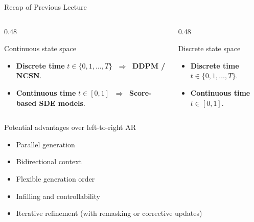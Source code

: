 \documentclass{beamer}
\begin{document}
\begin{frame}{Recap of Previous Lecture}
	\begin{columns}[T]
	\begin{column}{0.48\textwidth}
	\begin{block}{Continuous state space}
		\begin{itemize}
			\item \textbf{Discrete time} $t \in \{0,1,\ldots,T\}$ $\;\Rightarrow\;$ \textbf{DDPM / NCSN}.
			\item \textbf{Continuous time} $t \in [0,1]$ $\;\Rightarrow\;$ \textbf{Score-based SDE models}.
		\end{itemize}
	\end{block}
	\end{column}
	\begin{column}{0.48\textwidth}
	\begin{block}{Discrete state space}
		\begin{itemize}
			\item \textbf{Discrete time} $t \in \{0,1,\ldots,T\}$.
			\item \textbf{Continuous time} $t \in [0,1]$.
		\end{itemize}
	\end{block}
	\end{column}
	\end{columns}
	\begin{block}{Potential advantages over left-to-right AR}
		\begin{itemize}
			\item Parallel generation
			\item Bidirectional context
			\item Flexible generation order
			\item Infilling and controllability
			\item Iterative refinement (with remasking or corrective updates)
		\end{itemize}
	\end{block}
\end{frame}
\end{document}
